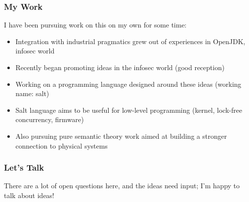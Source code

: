 \documentclass{beamer}
\begin{document}
\begin{frame}
  \frametitle{My Work}
  I have been pursuing work on this on my own for some time:
  \begin{itemize}
    \item Integration with industrial pragmatics grew out of
      experiences in OpenJDK, infosec world
    \item Recently began promoting ideas in the infosec world (good reception)
    \item Working on a programming language designed around these
      ideas (working name: salt)
    \item Salt language aims to be useful for low-level programming
      (kernel, lock-free concurrency, firmware)
    \item Also pursuing pure semantic theory work aimed at building a
      stronger connection to physical systems
  \end{itemize}
\end{frame}

\begin{frame}
  \frametitle{Let's Talk}

  There are a lot of open questions here, and the ideas need input;
  I'm happy to talk about ideas!
\end{frame}
\end{document}
